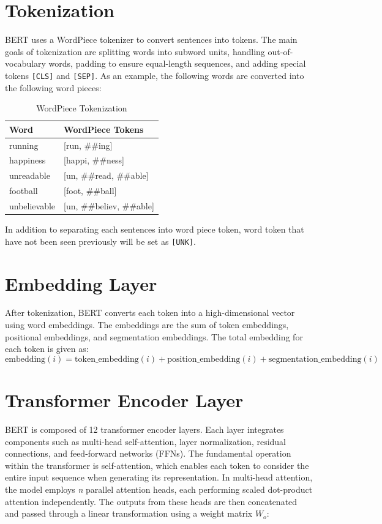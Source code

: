 \section{Tokenization}
BERT uses a WordPiece tokenizer to convert sentences into tokens. The main goals of tokenization are splitting words into subword units, handling out-of-vocabulary words, padding to ensure equal-length sequences, and adding special tokens \texttt{[CLS]} and \texttt{[SEP]}. As an example, the following words are converted into the following word pieces:

\begin{table}[H]
    \centering
    \begin{tabular}{|l|l|}
        \hline
        \textbf{Word} & \textbf{WordPiece Tokens} \\
        \hline
        running & [run, \#\#ing] \\
        happiness & [happi, \#\#ness] \\
        unreadable & [un, \#\#read, \#\#able] \\
        football & [foot, \#\#ball] \\
        unbelievable & [un, \#\#believ, \#\#able] \\
        \hline
    \end{tabular}
    \caption{WordPiece Tokenization}
    \label{tab:wordpiece}
\end{table}
In addition to separating each sentences into word piece token, word token that have not been seen previously will be set as \texttt{[UNK]}.

\section{Embedding Layer}
After tokenization, BERT converts each token into a high-dimensional vector using word embeddings. The embeddings are the sum of token embeddings, positional embeddings, and segmentation embeddings. The total embedding for each token is given as:
\begin{equation}\label{eqn11}
    \text{embedding}(i) = \text{token\_embedding}(i) \allowbreak + \text{position\_embedding}(i) \allowbreak + \text{segmentation\_embedding}(i)
\end{equation}

\section{Transformer Encoder Layer}
BERT is composed of 12 transformer encoder layers. Each layer integrates components such as multi-head self-attention, layer normalization, residual connections, and feed-forward networks (FFNs). The fundamental operation within the transformer is self-attention, which enables each token to consider the entire input sequence when generating its representation. In multi-head attention, the model employs \textit{n} parallel attention heads, each performing scaled dot-product attention independently. The outputs from these heads are then concatenated and passed through a linear transformation using a weight matrix \( W_o \):

